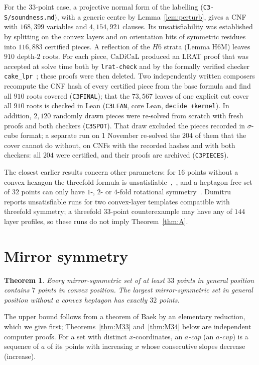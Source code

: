 \documentclass[11pt]{article}
\newtheorem{theorem}{Theorem}
\theoremstyle{remark}
\begin{document}
For the $33$-point case, a projective normal form of the labelling (\texttt{C3-S/soundness.md}), with a generic centre by
Lemma~\ref{lem:perturb}, gives a CNF with $168{,}399$ variables and $4{,}154{,}921$ clauses. Its unsatisfiability was
established by splitting on the convex layers and on orientation bits of symmetric residues into $116{,}883$ certified
pieces. A reflection of the $H6$ strata (Lemma H6M) leaves $910$ depth-$2$ roots. For each piece, CaDiCaL produced an LRAT
proof that was accepted at solve time both by \texttt{lrat-check} and by the formally verified checker
\texttt{cake\_lpr}~\cite{THM21}; these proofs were then deleted. Two independently written composers recompute the CNF
hash of every certified piece from the base formula and find all $910$ roots covered (\texttt{C3FINAL}); that the
$73{,}567$ leaves of one explicit cut cover all $910$ roots is checked in Lean (\texttt{C3LEAN}, core Lean,
\texttt{decide +kernel}). In addition, $2{,}120$ randomly drawn pieces were re-solved from scratch with fresh proofs and
both checkers (\texttt{C3SPOT}). That draw excluded the pieces recorded in $\sigma$-cube format; a separate run on
1 November re-solved the $204$ of them that the cover cannot do without, on CNFs with the recorded hashes and with both
checkers: all $204$ were certified, and their proofs are archived (\texttt{C3PIECES}).

The closest earlier results concern other parameters: for $16$ points without a convex hexagon the threefold formula is
unsatisfiable~\cite[\S6.1]{SMQH25},~\cite{Mac25}, and a heptagon-free set of $32$ points can only have $1$-, $2$- or
$4$-fold rotational symmetry~\cite[\S6.2]{SMQH25}. Dumitru~\cite[Table~1]{Dum25} reports unsatisfiable runs for two
convex-layer templates compatible with threefold symmetry; a threefold $33$-point counterexample may have any of $144$
layer profiles, so these runs do not imply Theorem~\ref{thm:A}.

\section{Mirror symmetry}\label{sec:mirror}
\begin{theorem}\label{thm:M}
Every mirror-symmetric set of at least $33$ points in general position contains $7$ points in convex position. The largest
mirror-symmetric set in general position without a convex heptagon has exactly $32$ points.
\end{theorem}
The upper bound follows from a theorem of Baek by an elementary reduction, which we give first;
Theorems~\ref{thm:M33} and~\ref{thm:M34} below are independent computer proofs. For a set with distinct
$x$-coordinates, an \emph{$a$-cap} (an \emph{$a$-cup}) is a sequence of $a$ of its points with increasing $x$ whose
consecutive slopes decrease (increase).
\end{document}
